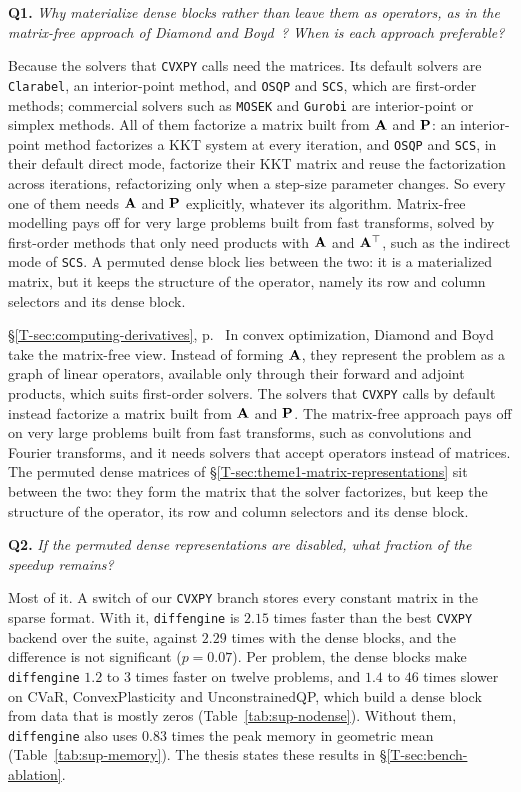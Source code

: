 \documentclass[letterpaper,12pt]{article}
\newcommand{\tsec}[1]{\S\ref{T-#1}}
\newcommand{\tpage}[1]{p.~\pageref{T-#1}}
\newcommand{\tref}[1]{\tsec{#1}, \tpage{#1}}
\newcommand{\question}[2]{\FloatBarrier\par\bigskip\textbf{Q#1.} \emph{#2}\par}
\begin{document}
\question{1}{Why materialize dense blocks rather than leave them as operators, as in the
matrix-free approach of Diamond and Boyd~\cite{diamond2016matrixfree}? When is each approach
preferable?}
Because the solvers that \texttt{CVXPY} calls need the matrices. Its default solvers are
\texttt{Clarabel}, an interior-point method, and \texttt{OSQP} and \texttt{SCS}, which are
first-order methods; commercial solvers such as \texttt{MOSEK} and \texttt{Gurobi} are
interior-point or simplex methods. All of them factorize a matrix built from $\mathbf{A}$ and
$\mathbf{P}$: an interior-point method factorizes a KKT system at every iteration, and
\texttt{OSQP} and \texttt{SCS}, in their default direct mode, factorize their KKT matrix and
reuse the factorization across iterations, refactorizing only when a step-size parameter changes. So every one of them needs $\mathbf{A}$ and $\mathbf{P}$ explicitly,
whatever its algorithm. Matrix-free modelling pays off for very large problems built from fast
transforms, solved by first-order methods that only need products with $\mathbf{A}$ and
$\mathbf{A}^\top$, such as the indirect mode of \texttt{SCS}. A permuted dense block lies between
the two: it is a materialized matrix, but it keeps the structure of the operator, namely its
row and column selectors and its dense block.

\begin{thesisquote}{\tref{sec:computing-derivatives}}
In convex optimization, Diamond and Boyd take the matrix-free view. Instead of forming
$\mathbf{A}$, they represent the problem as a graph of linear operators, available only through
their forward and adjoint products, which suits first-order solvers. The solvers that
\texttt{CVXPY} calls by default instead factorize a matrix built from $\mathbf{A}$ and $\mathbf{P}$.
The matrix-free approach pays off on very large problems built from fast transforms, such as
convolutions and Fourier transforms, and it needs solvers that accept operators instead of
matrices. The permuted dense matrices of \tsec{sec:theme1-matrix-representations} sit between the two: they form the matrix that
the solver factorizes, but keep the structure of the operator, its row and column selectors and
its dense block.
\end{thesisquote}

\question{2}{If the permuted dense representations are disabled, what fraction of the speedup
remains?}
Most of it. A switch of our \texttt{CVXPY} branch stores every constant matrix in the sparse
format. With it, \texttt{diffengine} is $2.15$ times faster than the best \texttt{CVXPY} backend
over the suite, against $2.29$ times with the dense blocks, and the difference is not
significant ($p = 0.07$). Per problem, the dense blocks make \texttt{diffengine} $1.2$ to $3$
times faster on twelve problems, and $1.4$ to $46$ times slower on CVaR, ConvexPlasticity and
UnconstrainedQP, which build a dense block from data that is mostly zeros
(Table~\ref{tab:sup-nodense}). Without them, \texttt{diffengine} also uses $0.83$ times the peak
memory in geometric mean (Table~\ref{tab:sup-memory}).
The thesis states these results in \tsec{sec:bench-ablation}.
\end{document}

